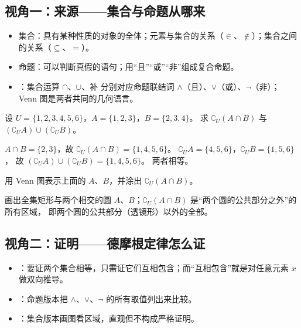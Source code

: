 \begin{explore}
\subsection{视角一：来源——集合与命题从哪来}

\begin{itemize}
  \item 集合：具有某种性质的对象的全体；元素与集合的关系（$\in$、$\notin$）；集合之间的关系（$\subseteq$、$=$）。
  \item 命题：可以判断真假的语句；用“且”“或”“非”组成复合命题。
  \item {}：集合运算 $\cap$、$\cup$、补 分别对应命题联结词 $\land$（且）、$\lor$（或）、$\neg$（非）；
        Venn 图是两者共同的几何语言。
\end{itemize}

\begin{example}
设 $U=\{1,2,3,4,5,6\}$，$A=\{1,2,3\}$，$B=\{2,3,4\}$。
求 $\complement_U(A\cap B)$ 与 $(\complement_U A)\cup(\complement_U B)$。
\end{example}
\begin{solution}
$A\cap B=\{2,3\}$，故 $\complement_U(A\cap B)=\{1,4,5,6\}$。
$\complement_U A=\{4,5,6\}$，$\complement_U B=\{1,5,6\}$，
故 $(\complement_U A)\cup(\complement_U B)=\{1,4,5,6\}$。
两者相等。
\end{solution}

\begin{problem}
用 Venn 图表示上面的 $A$、$B$，并涂出 $\complement_U(A\cap B)$。
\end{problem}
\begin{solution}
画出全集矩形与两个相交的圆 $A$、$B$；$\complement_U(A\cap B)$ 是“两个圆的公共部分之外”的所有区域，
即两个圆的公共部分（透镜形）以外的全部。
\end{solution}

\subsection{视角二：证明——德摩根定律怎么证}

\begin{itemize}
  \item {}：要证两个集合相等，只需证它们互相包含；而“互相包含”就是对任意元素 $x$ 做双向推导。
  \item {}：命题版本把 $\land$、$\lor$、$\neg$ 的所有取值列出来比较。
  \item {}：集合版本画图看区域，直观但不构成严格证明。
\end{itemize}


\end{explore}

